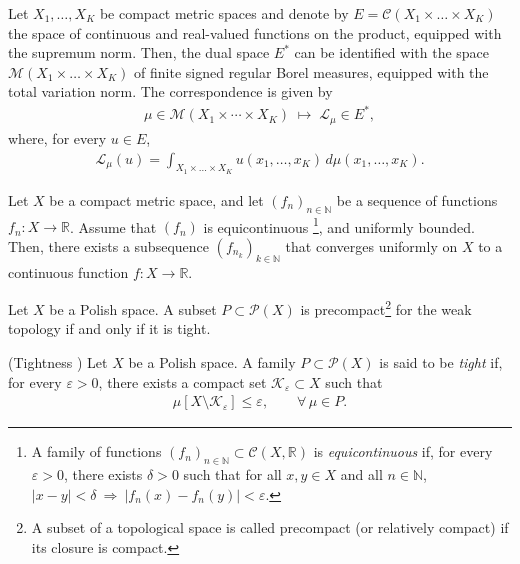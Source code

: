 \documentclass[twoside,11pt,a4paper]{article}
\begin{document}
\begin{theorem}\label{RIEZ}
Let $X_1, \dots, X_K$ be compact metric spaces and denote by $ E=\mathcal{C}(X_1 \times\ldots \times X_K)$ the space of continuous and real-valued functions
on the product, equipped with the supremum norm. 
Then, the dual space $E^*$ can be identified with the space $\mathcal{M}\!(X_1 \times\ldots \times X_K)$ of finite signed regular Borel measures, equipped with the total variation norm. The correspondence is given by
\begin{align*}
\mu \in \mathcal M(X_1 \times \cdots \times X_K)
\;\longmapsto\;
\mathcal{L}_\mu \in E^{*},
\end{align*}
where, for every $u \in E$,
\begin{align*}
\mathcal{L}_\mu(u) 
= \int_{X_1 \times\ldots \times X_K} 
u(x_1, \dots, x_K)\, d\mu(x_1, \dots, x_K).
\end{align*}
\end{theorem}


\begin{theorem}
\label{arz}
Let $X$ be a compact metric space, and let $(f_n)_{n\in\mathbb{N}}$ 
be a sequence of functions $f_n : X \to \mathbb{R}$.
Assume that $(f_n)$ is equicontinuous \footnote{A family of functions $(f_n)_{n \in \mathbb{N}} \subset \mathcal{C}(X,\mathbb{R})$ is \textit{equicontinuous} if, 
for every $\varepsilon > 0$, there exists $\delta > 0$ such that for all $x, y \in X$ and all $n \in \mathbb{N}$, $|x - y| < \delta \ \Rightarrow \ |f_n(x) - f_n(y)| < \varepsilon$.}, and uniformly bounded. Then, there exists a subsequence $(f_{n_k})_{k\in\mathbb{N}}$ 
that converges uniformly on $X$ to a continuous function 
$f : X \to \mathbb{R}$.
\end{theorem}



\begin{theorem}\label{prokhorov}
Let $X$ be a Polish space. A subset $P \subset \mathcal{P}(X)$ is precompact\footnote{A subset of a topological space is called precompact (or relatively compact) if its closure is compact.}
for the weak topology if and only if it is tight.
\end{theorem}


\begin{definition}\label{tightness}
(Tightness \cite{villani2008})
Let $X$ be a Polish space. A family $P \subset \mathcal{P}(X)$ is said to be \emph{tight} if, 
for every $\varepsilon>0$, there exists a compact set $\mathcal{K}_\varepsilon \subset X$ such that
\begin{align*}
\mu[X \setminus \mathcal{K}_\varepsilon] \le \varepsilon,
\qquad \forall\, \mu \in P.
\end{align*}
\end{definition}
\end{document}
